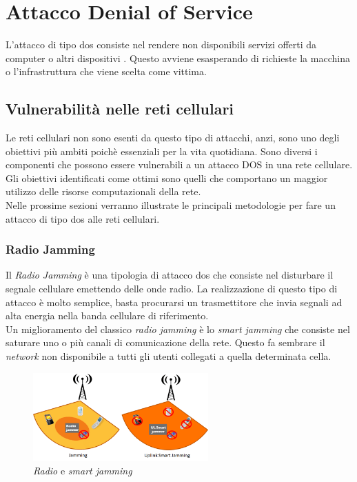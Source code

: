 \chapter{Attacco Denial of Service}
L'attacco di tipo \gls{dos} consiste nel rendere non disponibili servizi offerti da computer o altri
dispositivi \cite{dos-definition}. Questo avviene esasperando di richieste la macchina o l'infrastruttura che viene scelta come
vittima.

\section{Vulnerabilità nelle reti cellulari}
Le reti cellulari non sono esenti da questo tipo di attacchi, anzi, sono uno degli obiettivi più ambiti poichè essenziali per la vita quotidiana.
Sono diversi i componenti che possono essere vulnerabili a un attacco DOS in una rete cellulare. Gli obiettivi identificati come ottimi sono quelli
che comportano un maggior utilizzo delle risorse computazionali della rete.\\
Nelle prossime sezioni verranno illustrate le principali metodologie per fare un attacco di tipo \gls{dos} alle reti cellulari\cite{4g-dos-recap}.

\clearpage

\subsection{Radio Jamming}
Il \textit{Radio Jamming} è una tipologia di attacco \gls{dos} che consiste nel disturbare il segnale cellulare emettendo delle onde radio.
La realizzazione di questo tipo di attacco è molto semplice, basta procurarsi un trasmettitore che invia segnali ad alta energia nella banda cellulare di riferimento.\\
Un miglioramento del classico \textit{radio jamming} è lo \textit{smart jamming} che consiste nel saturare uno o più canali di comunicazione della rete. Questo fa sembrare 
il \textit{network} non disponibile a tutti gli utenti collegati a quella determinata cella.
\begin{figure}[h]
    \centering
    \includegraphics[width=0.6\textwidth]{images/dos-jamming.png}
    \caption{\textit{Radio} e \textit{smart jamming}\cite{4g-dos-recap}}
\end{figure}\\

